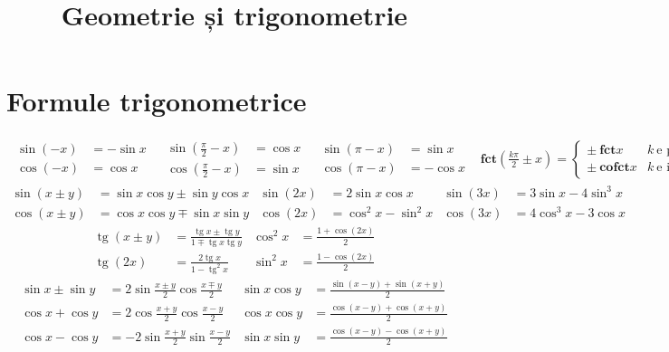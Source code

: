 \documentclass{article}
\title{Geometrie și trigonometrie}
\author{}
\date{}
\DeclareMathOperator{\tg}{tg}
\begin{document}
\maketitle
\section*{Formule trigonometrice}
\begin{align*}
    \begin{split}
        \sin(-x) &= -\sin x \\
        \cos(-x) &= \cos x
    \end{split} &
    \begin{split}
        \sin\left(\frac{\pi}{2} - x\right) &= \cos x \\
        \cos\left(\frac{\pi}{2} - x\right) &= \sin x
    \end{split} &
    \begin{split}
        \sin(\pi - x) &= \sin x \\
        \cos(\pi - x) &= -\cos x
    \end{split} &
    \textbf{fct}(\frac{k\pi}{2} \pm x) = \left\{\begin{array}{ll}
        \pm\ \textbf{fct} x & k\ \text{e par} \\
        \pm\ \textbf{cofct} x & k\ \text{e impar}
    \end{array}\right.
\end{align*}
\begin{align*}
    \sin(x\pm y) &= \sin x \cos y \pm \sin y \cos x &
    \sin(2x) &= 2\sin x \cos x &
    \sin(3x) &= 3\sin x - 4\sin^3 x \\
    \cos(x\pm y) &= \cos x \cos y \mp \sin x \sin y &
    \cos(2x) &= \cos^2 x - \sin^2 x &
    \cos(3x) &= 4\cos^3 x - 3\cos x
\end{align*}
\begin{align*}
    \tg(x\pm y) &= \frac{\tg x \pm \tg y}{1 \mp \tg x \tg y} &
    \cos^2 x &= \frac{1 + \cos(2x)}{2} \\
    \tg(2x) &= \frac{2 \tg x}{1 - \tg^2 x} &
    \sin^2 x &= \frac{1 - \cos(2x)}{2}
\end{align*}
\begin{align*}
    \sin x \pm \sin y &= 2 \sin \frac{x \pm y}{2} \cos \frac{x \mp y}{2} &
    \sin x \cos y &= \frac{\sin(x-y)+\sin(x+y)}{2} \\
    \cos x + \cos y &= 2 \cos \frac{x+y}{2} \cos \frac{x-y}{2} &
    \cos x \cos y &= \frac{\cos(x-y)+\cos(x+y)}{2} \\
    \cos x - \cos y &= -2 \sin \frac{x+y}{2} \sin \frac{x-y}{2} &
    \sin x \sin y &= \frac{\cos(x-y) - \cos(x+y)}{2}
\end{align*}
\end{document}
